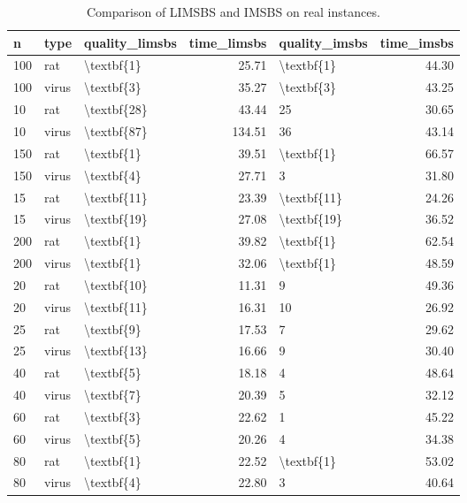 \begin{table}
\centering
\caption{Comparison of LIMSBS and IMSBS on real instances.}
\label{tab:real_results}
\begin{tabular}{lllrlr}
\toprule
  n &  type & quality\_limsbs &  time\_limsbs & quality\_imsbs &  time\_imsbs \\
\midrule
100 &   rat &     \textbackslash textbf\{1\} &        25.71 &    \textbackslash textbf\{1\} &       44.30 \\
100 & virus &     \textbackslash textbf\{3\} &        35.27 &    \textbackslash textbf\{3\} &       43.25 \\
 10 &   rat &    \textbackslash textbf\{28\} &        43.44 &            25 &       30.65 \\
 10 & virus &    \textbackslash textbf\{87\} &       134.51 &            36 &       43.14 \\
150 &   rat &     \textbackslash textbf\{1\} &        39.51 &    \textbackslash textbf\{1\} &       66.57 \\
150 & virus &     \textbackslash textbf\{4\} &        27.71 &             3 &       31.80 \\
 15 &   rat &    \textbackslash textbf\{11\} &        23.39 &   \textbackslash textbf\{11\} &       24.26 \\
 15 & virus &    \textbackslash textbf\{19\} &        27.08 &   \textbackslash textbf\{19\} &       36.52 \\
200 &   rat &     \textbackslash textbf\{1\} &        39.82 &    \textbackslash textbf\{1\} &       62.54 \\
200 & virus &     \textbackslash textbf\{1\} &        32.06 &    \textbackslash textbf\{1\} &       48.59 \\
 20 &   rat &    \textbackslash textbf\{10\} &        11.31 &             9 &       49.36 \\
 20 & virus &    \textbackslash textbf\{11\} &        16.31 &            10 &       26.92 \\
 25 &   rat &     \textbackslash textbf\{9\} &        17.53 &             7 &       29.62 \\
 25 & virus &    \textbackslash textbf\{13\} &        16.66 &             9 &       30.40 \\
 40 &   rat &     \textbackslash textbf\{5\} &        18.18 &             4 &       48.64 \\
 40 & virus &     \textbackslash textbf\{7\} &        20.39 &             5 &       32.12 \\
 60 &   rat &     \textbackslash textbf\{3\} &        22.62 &             1 &       45.22 \\
 60 & virus &     \textbackslash textbf\{5\} &        20.26 &             4 &       34.38 \\
 80 &   rat &     \textbackslash textbf\{1\} &        22.52 &    \textbackslash textbf\{1\} &       53.02 \\
 80 & virus &     \textbackslash textbf\{4\} &        22.80 &             3 &       40.64 \\
\bottomrule
\end{tabular}
\end{table}
